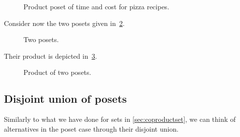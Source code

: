 \begin{figure}[h!]
    \begin{center}
    \end{center}
    \caption{Product poset of time and cost for pizza recipes.\label{fig:productpizza}}
\end{figure}


\begin{example}
    Consider now the two posets given in~\cref{fig:composing_posets_1}.
    \begin{figure}[h!]
        \begin{center}
        \end{center}
        \caption{Two posets. \label{fig:composing_posets_1}}
    \end{figure}
    Their product is depicted in~\cref{fig:composing_posets_2}.
    \begin{figure}[h!]
        \begin{center}
        \end{center}
        \caption{Product of two posets. \label{fig:composing_posets_2}}
    \end{figure}
\end{example}

\subsection{Disjoint union of posets}

Similarly to what we have done for sets in \cref{sec:coproductset}, we can think of alternatives in the poset case through their disjoint union.

